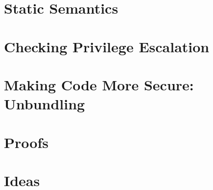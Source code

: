 \documentclass[[12pt,a4paper,twoside,openrigh]{article}
\begin{document}

\section{Static Semantics}
\label{sec:statics}


\section{Checking Privilege Escalation}
\label{sec:privesc}

\newpage

\section{Making Code More Secure: Unbundling}
\label{sec:flow}

\newpage

\section{Proofs}
\label{sec:proofs}

\newpage

\section{Ideas}
\label{sec:ideas}
\end{document}
